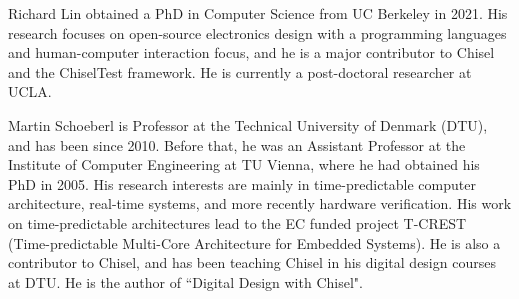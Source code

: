 \documentclass[conference]{IEEEtran}
\begin{document}
\begin{IEEEbiography}{Richard Lin}
obtained a PhD in Computer Science from UC Berkeley in 2021.  
His research focuses on open-source electronics design with a programming languages and human-computer interaction focus, and he is a major contributor to Chisel and the ChiselTest framework.
He is currently a post-doctoral researcher at UCLA.
\end{IEEEbiography}

\begin{IEEEbiography}{Martin Schoeberl}
  is Professor at the Technical University of Denmark (DTU), and has been since 2010.
  Before that, he was an Assistant Professor at the Institute of Computer Engineering at TU Vienna, where he had obtained his PhD in 2005.
  His research interests are mainly in time-predictable computer architecture, real-time systems, and more recently hardware verification.
  His work on time-predictable architectures lead to the EC funded project T-CREST (Time-predictable Multi-Core Architecture for Embedded Systems).
  He is also a contributor to Chisel, and has been teaching Chisel in his digital design courses at DTU.
  He is the author of ``Digital Design with Chisel".
\end{IEEEbiography}
\end{document}
